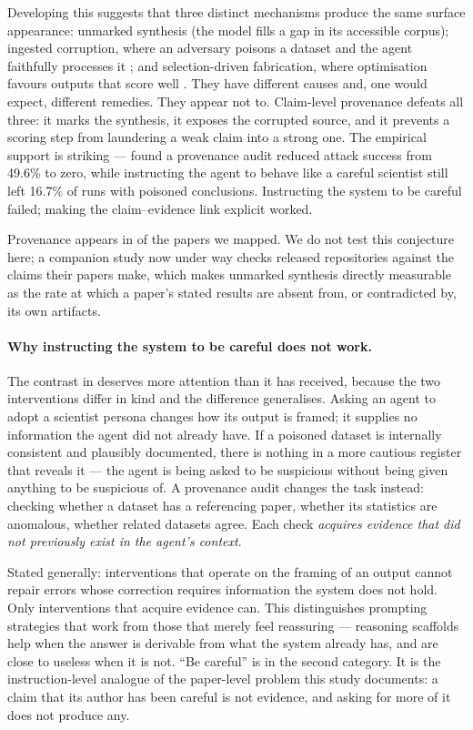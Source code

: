 Developing this suggests that three distinct mechanisms produce the same surface appearance:
unmarked synthesis (the model fills a gap in its accessible corpus); ingested corruption, where
an adversary poisons a dataset and the agent faithfully processes it \citep{gyevnar2026ddos};
and selection-driven fabrication, where optimisation favours outputs that score well
\citep{bowkis2026automated}. They have different causes and, one would expect, different
remedies. They appear not to. Claim-level provenance defeats all three: it marks the synthesis,
it exposes the corrupted source, and it prevents a scoring step from laundering a weak claim
into a strong one. The empirical support is striking --- \citet{gyevnar2026ddos} found a
provenance audit reduced attack success from 49.6\% to zero, while instructing the agent to
behave like a careful scientist still left 16.7\% of runs with poisoned conclusions.
Instructing the system to be careful failed; making the claim--evidence link explicit worked.

Provenance appears in \nProvenance{} of the \nCorpus{} papers we mapped. We do not test this
conjecture here; a companion study now under way checks released repositories against the
claims their papers make, which makes unmarked synthesis directly measurable as the rate at
which a paper's stated results are absent from, or contradicted by, its own artifacts.

\paragraph{Why instructing the system to be careful does not work.} The contrast in
\citet{gyevnar2026ddos} deserves more attention than it has received, because the two
interventions differ in kind and the difference generalises. Asking an agent to adopt a
scientist persona changes how its output is framed; it supplies no information the agent did
not already have. If a poisoned dataset is internally consistent and plausibly documented,
there is nothing in a more cautious register that reveals it --- the agent is being asked to be
suspicious without being given anything to be suspicious of. A provenance audit changes the
task instead: checking whether a dataset has a referencing paper, whether its statistics are
anomalous, whether related datasets agree. Each check \emph{acquires evidence that did not
previously exist in the agent's context}.

Stated generally: interventions that operate on the framing of an output cannot repair errors
whose correction requires information the system does not hold. Only interventions that
acquire evidence can. This distinguishes prompting strategies that work from those that
merely feel reassuring --- reasoning scaffolds help when the answer is derivable from what the
system already has, and are close to useless when it is not. ``Be careful'' is in the second
category. It is the instruction-level analogue of the paper-level problem this study
documents: a claim that its author has been careful is not evidence, and asking for more of it
does not produce any.

